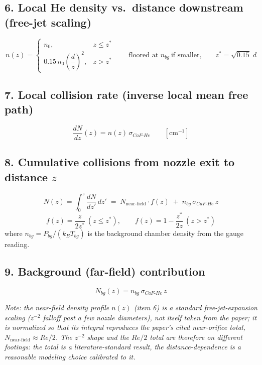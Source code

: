 \documentclass[11pt]{article}
\begin{document}
\subsection*{6. Local He density vs.\ distance downstream (free-jet scaling)}
\begin{equation}
n(z) =
\begin{cases}
n_0, & z \le z^{*} \\[4pt]
0.15\, n_0 \left(\dfrac{d}{z}\right)^{2}, & z > z^{*}
\end{cases}
\qquad\text{floored at } n_{bg}\ \text{if smaller,} \qquad z^{*} = \sqrt{0.15}\; d
\end{equation}

\subsection*{7. Local collision rate (inverse local mean free path)}
\begin{equation}
\dfrac{dN}{dz}(z) = n(z)\, \sigma_{CaF\text{-}He} \qquad [\text{cm}^{-1}]
\end{equation}

\subsection*{8. Cumulative collisions from nozzle exit to distance $z$}
\begin{equation}
N(z) = \int_0^{z} \dfrac{dN}{dz'}\, dz' \;=\; N_{\text{near-field}} \cdot f(z) \;+\; n_{bg}\, \sigma_{CaF\text{-}He}\, z
\end{equation}
\begin{equation}
f(z) = \dfrac{z}{2 z^{*}} \ (z \le z^{*}), \qquad
f(z) = 1 - \dfrac{z^{*}}{2 z} \ (z > z^{*})
\end{equation}
where $n_{bg} = P_{bg} / (k_B T_{bg})$ is the background chamber density from the gauge reading.

\subsection*{9. Background (far-field) contribution}
\begin{equation}
N_{bg}(z) = n_{bg}\, \sigma_{CaF\text{-}He}\, z
\end{equation}

\bigskip
\noindent\textit{Note: the near-field density profile $n(z)$ (item 6) is a standard free-jet-expansion
scaling ($z^{-2}$ falloff past a few nozzle diameters), not itself taken from the paper; it is normalized
so that its integral reproduces the paper's cited near-orifice total, $N_{\text{near-field}}\approx Re/2$.
The $z^{-2}$ shape and the $Re/2$ total are therefore on different footings: the total is a
literature-standard result, the distance-dependence is a reasonable modeling choice calibrated to it.}
\end{document}
